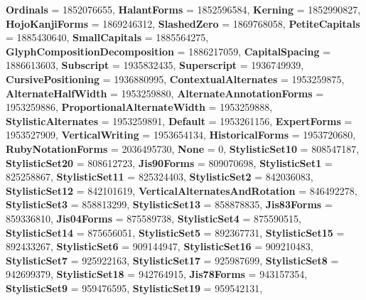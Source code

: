 \begin{DoxyCompactItemize}
{\bfseries Ordinals} = 1852076655, 
{\bfseries Halant\+Forms} = 1852596584, 
{\bfseries Kerning} = 1852990827, 
{\bfseries Hojo\+Kanji\+Forms} = 1869246312, 
\newline
{\bfseries Slashed\+Zero} = 1869768058, 
{\bfseries Petite\+Capitals} = 1885430640, 
{\bfseries Small\+Capitals} = 1885564275, 
{\bfseries Glyph\+Composition\+Decomposition} = 1886217059, 
\newline
{\bfseries Capital\+Spacing} = 1886613603, 
{\bfseries Subscript} = 1935832435, 
{\bfseries Superscript} = 1936749939, 
{\bfseries Cursive\+Positioning} = 1936880995, 
\newline
{\bfseries Contextual\+Alternates} = 1953259875, 
{\bfseries Alternate\+Half\+Width} = 1953259880, 
{\bfseries Alternate\+Annotation\+Forms} = 1953259886, 
{\bfseries Proportional\+Alternate\+Width} = 1953259888, 
\newline
{\bfseries Stylistic\+Alternates} = 1953259891, 
{\bfseries Default} = 1953261156, 
{\bfseries Expert\+Forms} = 1953527909, 
{\bfseries Vertical\+Writing} = 1953654134, 
\newline
{\bfseries Historical\+Forms} = 1953720680, 
{\bfseries Ruby\+Notation\+Forms} = 2036495730, 
{\bfseries None} = 0, 
{\bfseries Stylistic\+Set10} = 808547187, 
\newline
{\bfseries Stylistic\+Set20} = 808612723, 
{\bfseries Jis90\+Forms} = 809070698, 
{\bfseries Stylistic\+Set1} = 825258867, 
{\bfseries Stylistic\+Set11} = 825324403, 
\newline
{\bfseries Stylistic\+Set2} = 842036083, 
{\bfseries Stylistic\+Set12} = 842101619, 
{\bfseries Vertical\+Alternates\+And\+Rotation} = 846492278, 
{\bfseries Stylistic\+Set3} = 858813299, 
\newline
{\bfseries Stylistic\+Set13} = 858878835, 
{\bfseries Jis83\+Forms} = 859336810, 
{\bfseries Jis04\+Forms} = 875589738, 
{\bfseries Stylistic\+Set4} = 875590515, 
\newline
{\bfseries Stylistic\+Set14} = 875656051, 
{\bfseries Stylistic\+Set5} = 892367731, 
{\bfseries Stylistic\+Set15} = 892433267, 
{\bfseries Stylistic\+Set6} = 909144947, 
\newline
{\bfseries Stylistic\+Set16} = 909210483, 
{\bfseries Stylistic\+Set7} = 925922163, 
{\bfseries Stylistic\+Set17} = 925987699, 
{\bfseries Stylistic\+Set8} = 942699379, 
\newline
{\bfseries Stylistic\+Set18} = 942764915, 
{\bfseries Jis78\+Forms} = 943157354, 
{\bfseries Stylistic\+Set9} = 959476595, 
{\bfseries Stylistic\+Set19} = 959542131, 

\end{DoxyCompactItemize}
